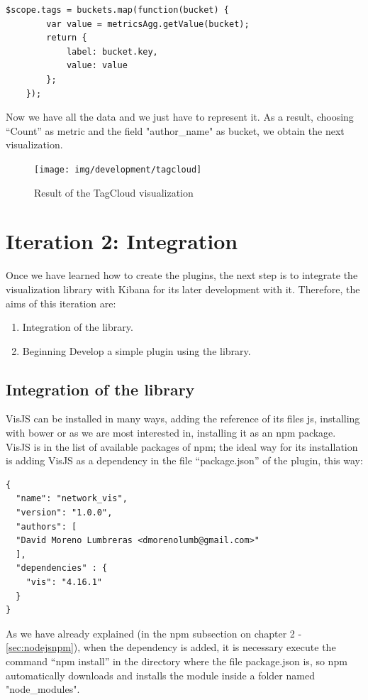 \documentclass[a4paper, 12pt]{book}
\begin{document}
\begin{lstlisting}[frame=single]
	$scope.tags = buckets.map(function(bucket) {
		var value = metricsAgg.getValue(bucket);
		return {
			label: bucket.key,
			value: value
		};
	});
\end{lstlisting}

Now we have all the data and we just have to represent it. As a result, choosing “Count” as metric and the field "author\_name" as bucket, we obtain the next visualization.

\begin{figure}[H]
  \centering
  \texttt{[image: img/development/tagcloud]}
  \caption{Result of the TagCloud visualization}
  \label{fig:plugintagcolud}
\end{figure}

\section{Iteration 2: Integration}

Once we have learned how to create the plugins, the next step is to integrate the visualization library with Kibana for its later development with it. Therefore, the aims of this iteration are:

\begin{enumerate}
\item Integration of the library.
\item Beginning Develop a simple plugin using the library.
\end{enumerate}

\subsection{Integration of the library}

VisJS can be installed in many ways, adding the reference of its files js, installing with bower or as we are most interested in, installing it as an npm package. VisJS is in the list of available packages of npm; the ideal way for its installation is adding VisJS as a dependency in the file “package.json” of the plugin, this way:

\begin{lstlisting}[frame=single]
{
  "name": "network_vis",
  "version": "1.0.0",
  "authors": [
  "David Moreno Lumbreras <dmorenolumb@gmail.com>"
  ],
  "dependencies" : {
    "vis": "4.16.1"
  }
}
\end{lstlisting}

As we have already explained (in the npm subsection on chapter 2 - \ref{sec:nodejsnpm}), when the dependency is added, it is necessary execute the command “npm install” in the directory where the file package.json is, so npm automatically downloads and installs the module inside a folder named "node\_modules".
\end{document}

